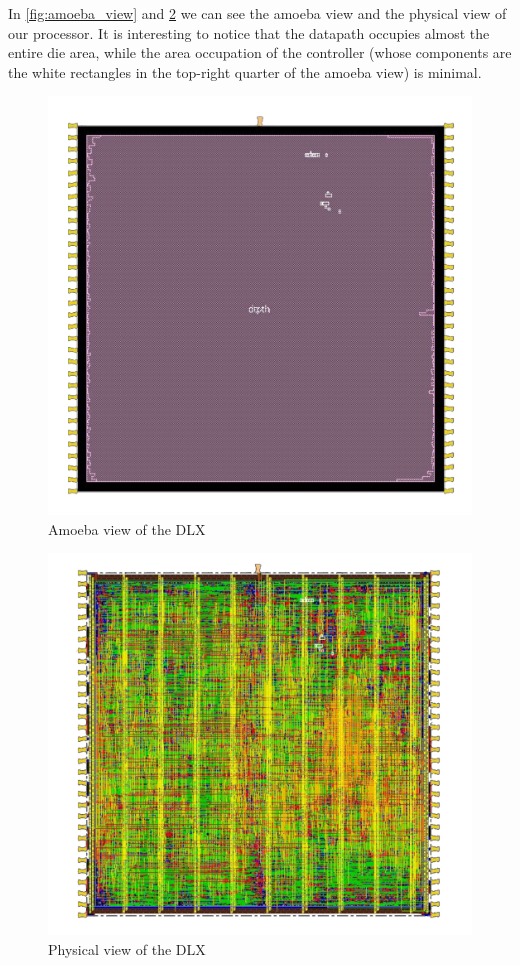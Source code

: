 In \autoref{fig:amoeba_view}  and \ref{fig:phy-view} we can see the amoeba view and the physical view of our processor.
It is interesting to notice that the datapath occupies almost the entire die area, while the area occupation of the controller (whose components are the white rectangles in the top-right quarter of the amoeba view) is minimal. 
\begin{figure}
    \centering
    \includegraphics[width=0.7\linewidth]{images/amoeba_view.png}
    \caption{Amoeba view of the DLX}
    \label{fig:amoeba_view}
\end{figure}
\begin{figure}
    \centering
    \includegraphics[width=0.7\linewidth]{images/phy_view.png}
    \caption{Physical view of the DLX}
    \label{fig:phy-view}
\end{figure}